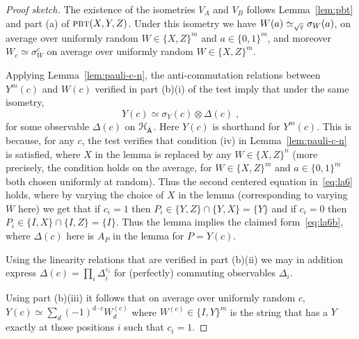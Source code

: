 \begin{proof}[Proof sketch]
The existence of the isometries $V_A$ and $V_B$ follows Lemma~\ref{lem:pbt} and part (a) of $\textsc{pbt}(X,Y,Z)$. 
 Under this isometry we have $W(a) \simeq_{\sqrt{\varepsilon}} \sigma_W(a)$, on average over uniformly random $W\in\{X,Z\}^m$ and $a\in\{0,1\}^m$, and moreover $W_c \simeq \sigma_W^c$ on average over uniformly random $W\in\{X,Z\}^m$. 

Applying Lemma~\ref{lem:pauli-c-n}, the anti-commutation relations between $Y^m(c)$ and $W(c)$ verified in part (b)(i) of the test imply that under the same isometry,
\begin{equation}\label{eq:la6b}
 Y(c) \simeq \sigma_Y(c) \otimes {\Delta}(c)\;,
\end{equation}
for some observable ${\Delta}(c)$ on ${\mathcal{H}}_{\hat{{\textsf{A}}}}$. Here $Y(c)$ is shorthand for $Y^m(c)$. This is because, for any $c$, the test verifies that condition (iv) in Lemma~\ref{lem:pauli-c-n} is satisfied, where $X$ in the lemma is replaced by any $W\in\{X,Z\}^n$ (more precisely, the condition holds on the average, for $W\in\{X,Z\}^m$ and $a\in\{0,1\}^m$ both chosen uniformly at random). Thus the second centered equation in~\eqref{eq:la6} holds, where by varying the choice of $X$ in the lemma (corresponding to varying $W$ here) we get that if $c_i=1$ then $P_i\in \{Y,Z\}\cap \{Y,X\}=\{Y\}$ and if $c_i=0$ then $P_i\in \{I,X\}\cap\{I,Z\}=\{I\}$. Thus the lemma implies the claimed form~\eqref{eq:la6b}, where $\Delta(c)$ here is $A_P$ in the lemma for $P=Y(c)$. 

Using the linearity relations that are verified in part (b)(ii) we may in addition express $\Delta(c) = \prod_i \Delta_{i}^{c_i}$ for (perfectly) commuting observables $\Delta_i$. 




Using part (b)(iii) it follows that on average over uniformly random $c$, $Y(c)\simeq \sum_d  (-1)^{d\cdot c} W^{(c)}_d$ where $W^{(c)} \in \{I,Y\}^m$ is the string that has a $Y$ exactly at those positions $i$ such that $c_i=1$. 



\end{proof}
